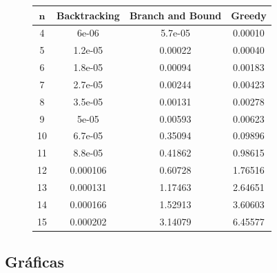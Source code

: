 \documentclass[a4]{article}
\begin{document}
\begin{figure}[H]
  \centering
  \label{tab:tiempos}
  \begin{tabular}{| c | c | c | c |}
    \hline
    \multicolumn{1}{|c|}{$\textbf{n}$}& \textbf{Backtracking}&
    \textbf{Branch and Bound}& \textbf{Greedy} \\ \hline
     4 & 6e-06	   & 5.7e-05  & 0.00010  \\ 
     5 & 1.2e-05   & 0.00022  & 0.00040  \\ 
     6 & 1.8e-05   & 0.00094  & 0.00183  \\ 
     7 & 2.7e-05   & 0.00244  & 0.00423  \\ 
     8 & 3.5e-05   & 0.00131  & 0.00278  \\ 
     9 & 5e-05	   & 0.00593  & 0.00623  \\ 
    10 & 6.7e-05   & 0.35094  & 0.09896  \\ 
    11 & 8.8e-05   & 0.41862  & 0.98615  \\ 
    12 & 0.000106  & 0.60728  & 1.76516  \\
    13 & 0.000131  & 1.17463  & 2.64651  \\
    14 & 0.000166  & 1.52913  & 3.60603  \\
    15 & 0.000202  & 3.14079  & 6.45577  \\ \hline
  \end{tabular}
\end{figure}

\subsection{Gráficas}
\end{document}
